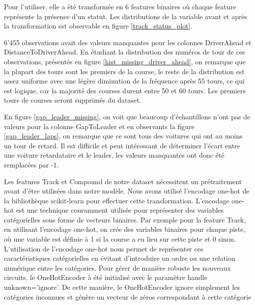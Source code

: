 Pour l'utiliser, elle a été transformée en 6 features binaires où chaque feature représente la présence d'un statut.
Les distributions de la variable avant et après la transformation est observable en figure \ref{track_status_plot}.

6'455 observations avait des valeurs manquantes pour les colonnes DriverAhead et DistanceToDriverAhead. En étudiant la distribution des numéros de tour de ces observations,
présentés en figure \ref{hist_missing_driver_ahead}, on remarque que la plupart des tours sont les premiers de la course,
le reste de la distribution est assez uniforme avec une légère diminution de la fréquence après 55 tours, ce qui est logique, car la majorité des courses durent entre 50 et 60 tours.
Les premiers tours de courses seront supprimés du dataset.


En figure \ref{gap_leader_missing}, on voit que beaucoup d'échantillons n'ont pas de valeurs pour la colonne GapToLeader et en observants la figure \ref{gap_leader_laps}, on remarque que ce sont tous des voitures qui ont au moins un tour de retard.
Il est difficile et peut intéressant de déterminer l'écart entre une voiture retardataire et le leader, les valeurs manquantes ont donc été remplacées par -1.



Les features Track et Compound de notre dataset nécessitent un prétraitement avant d'être utilisées dans notre modèle. Nous avons utilisé l'encodage one-hot de la bibliothèque scikit-learn pour effectuer cette transformation.
L'encodage one-hot est une technique couramment utilisée pour représenter des variables catégorielles sous forme de vecteurs binaires.
Par exemple pour la feature Track, en utilisant l'encodage one-hot, on crée des variables binaires pour chaque piste, où une variable est définie à 1 si la course a eu lieu sur cette piste et 0 sinon.
L'utilisation de l'encodage one-hot nous permet de représenter ces caractéristiques catégorielles en évitant d'introduire un ordre ou une relation numérique entre les catégories.
Pour gérer de manière robuste les nouveaux circuits, le OneHotEncoder à été initialisé avec le paramètre handle unknown='ignore'.
De cette manière, le OneHotEncoder ignore simplement les catégories inconnues et génère un vecteur de zéros correspondant à cette catégorie

